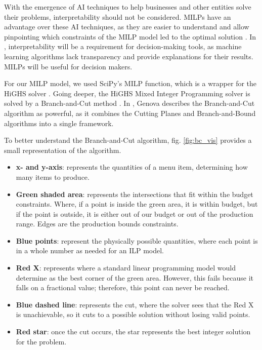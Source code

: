 \documentclass[journal]{IEEEtran}
\begin{document}
With the emergence of AI techniques to help businesses and other entities solve their problems, interpretability should not be considered. MILPs have an advantage over these AI techniques, as they are easier to understand and allow pinpointing which constraints of the MILP model led to the optimal solution \cite{50years}. In \cite{50years}, interpretability will be a requirement for decision-making tools, as machine learning algorithms lack transparency and provide explanations for their results. MILPs will be useful for decision makers.

For our MILP model, we used SciPy's MILP function, which is a wrapper for the HiGHS solver \cite{highs}. Going deeper, the HiGHS Mixed Integer Programming solver is solved by a Branch-and-Cut method \cite{highs}. In \cite{LIPMethods}, Genova describes the Branch-and-Cut algorithm as powerful, as it combines the Cutting Planes and Branch-and-Bound algorithms into a single framework. 

To better understand the Branch-and-Cut algorithm, fig. \ref{fig:bc_vis} provides a small representation of the algorithm. 

\begin{itemize}
    \item \textbf{x- and y-axis}: represents the quantities of a menu item, determining how many items to produce.
    \item \textbf{Green shaded area}: represents the intersections that fit within the budget constraints. Where, if a point is inside the green area, it is within budget, but if the point is outside, it is either out of our budget or out of the production range. Edges are the production bounds constraints.
    \item \textbf{Blue points}: represent the physically possible quantities, where each point is in a whole number as needed for an ILP model.
    \item \textbf{Red X}: represents where a standard linear programming model would determine as the best corner of the green area. However, this fails because it falls on a fractional value; therefore, this point can never be reached.
    \item \textbf{Blue dashed line}: represents the cut, where the solver sees that the Red X is unachievable, so it cuts to a possible solution without losing valid points.
    \item \textbf{Red star}: once the cut occurs, the star represents the best integer solution for the problem.
\end{itemize}
\end{document}
